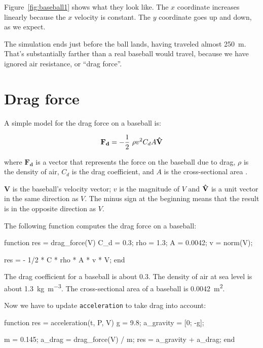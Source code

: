 \documentclass[
]{book}
\numberwithin{Answer}{chapter}
\numberwithin{Exercise}{chapter}
\renewcommand{\vec}[1]{\bm{\mathbf{#1}}}
\newcommand{\uveci}{{\bm{\hat{\textnormal{\bfseries\i}}}}}
\newcommand{\uvecj}{{\bm{\hat{\textnormal{\bfseries\j}}}}}
\newcommand{\uvec}[1]{%
    \ifthenelse{\equal{#1}{i}}%
        {\uveci}{%
    \ifthenelse{\equal{#1}{j}}%
        {\uvecj}{%
    {\bm{\hat{\mathbf{#1}}}}%
}}}
\begin{document}
Figure~\ref{fig:baseball1} shows what they look like.  The $x$ coordinate increases linearly because the $x$ velocity is constant.  The $y$ coordinate goes up and down, as we expect.

The simulation ends just before the ball lands, having traveled almost \SI{250}{\meter}.  That's substantially farther than a real baseball would travel, because we have ignored air resistance, or ``drag force''.


\section{Drag force}
\label{sect:drag}

A simple model for the drag force on a baseball is:

\begin{equation}
    \vec{F_d} = - \frac{1}{2} ~ \rho v^2 C_d A \uvec{V}
\end{equation}

where $\vec{F_d}$ is a vector that represents the force on the baseball
due to drag, 
$\rho$ is the density of air, 
$C_d$ is the drag coefficient, and
$A$ is the cross-sectional area .

$\vec{V}$ is the baseball's velocity vector; $v$ is the magnitude of $V$ and $\uvec{V}$ is a unit vector in the same direction as $V$.  The minus sign at the beginning means that the result is in the opposite direction as $V$.

The following function computes the drag force on a baseball:

\begin{code}
 function res = drag_force(V)
    C_d = 0.3;      %
    rho = 1.3;      %
    A = 0.0042;     %
    v = norm(V);    %

    res = - 1/2 * C * rho * A * v * V;
end
\end{code}
  
The drag coefficient for a baseball is about 0.3.  
The density of air at sea level is about \SI{1.3}{\kilogram\per\meter\cubed}.
The cross-sectional area of a baseball is \SI{0.0042}{\meter\squared}.

Now we have to update {\tt acceleration} to take drag into account:

\begin{code}
function res = acceleration(t, P, V)
    g = 9.8;                       %
    a_gravity = [0; -g];

    m = 0.145;                     %
    a_drag = drag_force(V) / m;
    res = a_gravity + a_drag;
end
\end{code}
\end{document}
